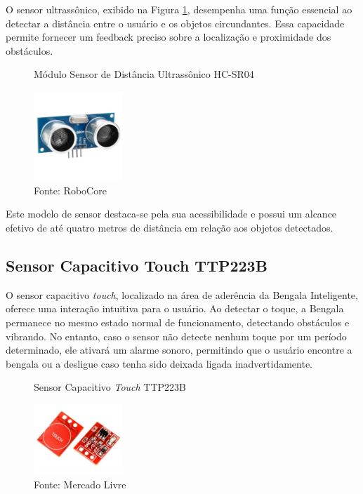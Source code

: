     O sensor ultrassônico, exibido na Figura \ref{fig:hcsr04}, desempenha uma função essencial ao detectar a distância entre o usuário e os objetos circundantes. Essa capacidade permite fornecer um feedback preciso sobre a localização e proximidade dos obstáculos. 

     \begin{figure}[ht]
        \captionsetup{width=1\textwidth}
        \caption{\label{fig:hcsr04} Módulo Sensor de Distância Ultrassônico HC-SR04}
        \centering
        \includegraphics[width=0.3\textwidth]{figuras/hcsr04} 
        \caption*{Fonte: RoboCore}
    \end{figure}

    Este modelo de sensor destaca-se pela sua acessibilidade e possui um alcance efetivo de até quatro metros de distância em relação aos objetos detectados.   

    \subsection{Sensor Capacitivo Touch TTP223B}

    O sensor capacitivo \textit{touch}, localizado na área de aderência da Bengala Inteligente, oferece uma interação intuitiva para o usuário. Ao detectar o toque, a Bengala permanece no mesmo estado normal de funcionamento, detectando obstáculos e vibrando. No entanto, caso o sensor não detecte nenhum toque por um período determinado, ele ativará um alarme sonoro, permitindo que o usuário encontre a bengala ou a desligue caso tenha sido deixada ligada inadvertidamente. 



     \begin{figure}[h!]
        \captionsetup{width=1\textwidth}
        \caption{\label{fig:touch}Sensor Capacitivo \textit{Touch} TTP223B}
        \centering
        \includegraphics[width=0.3\textwidth]{figuras/touch} 
        \caption*{Fonte: Mercado Livre}
    \end{figure}


